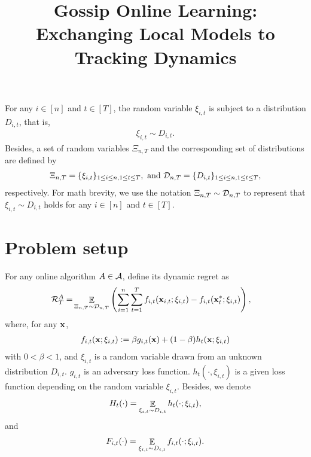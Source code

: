 \documentclass{article}
\title{Gossip Online Learning: Exchanging Local Models to Tracking Dynamics}
\begin{document}
\maketitle

\begin{abstract}








\end{abstract}



For any $i\in[n]$ and $t\in[T]$, the random variable $\xi_{i,t}$ is subject to a distribution $D_{i,t}$, that is,
\begin{align}
\nonumber
\xi_{i,t} \sim D_{i,t}.
\end{align} Besides, a set of random variables $\Xi_{n,T}$ and the corresponding set of distributions are defined by
\begin{align}
\nonumber
\Xi_{n,T} = \{ \xi_{i,t} \}_{1\le i \le n, 1 \le t \le T}, \text{~and~} \mathcal{D}_{n,T} = \{ D_{i,t} \}_{1\le i \le n, 1 \le t \le T},
\end{align} respectively. For math brevity, we use the notation $\Xi_{n,T} \sim \mathcal{D}_{n,T}$ to represent that $\xi_{i,t} \sim D_{i,t}$ holds for any $i\in[n]$ and $t\in[T]$.  


\section{Problem setup}


For any online algorithm $A \in {\mathcal{A}}$, define its dynamic regret as
\begin{align}
\nonumber
{\mathcal{R}}_T^{A} = & \mathop{\mathbb{E}}_{ \Xi_{n,T} \sim \mathcal{D}_{n,T} } \left(  \sum_{i=1}^n\sum_{t=1}^T f_{i,t}({\bf x}_{i,t};\xi_{i,t}) - f_{i,t}({\bf x}_t^\ast;\xi_{i,t})  \right),
\end{align} where, for any ${\bf x}$,
\begin{align}
\nonumber
f_{i,t}({\bf x};\xi_{i,t}) := \beta g_{i,t}({\bf x}) + (1-\beta) h_t({\bf x}; \xi_{i,t})
\end{align} with $0<\beta<1$, and $\xi_{i,t}$ is a random variable drawn from an unknown distribution $D_{i,t}$.  $g_{i,t}$ is an adversary loss function. $h_t(\cdot, \xi_{i,t})$ is a given loss function depending on the random variable $\xi_{i,t}$. Besides, we denote 
\begin{align}
\nonumber
H_t(\cdot) = \mathop{\mathbb{E}}_{\xi_{i,t} \sim D_{i,t}} h_t(\cdot; \xi_{i,t}),
\end{align} and 
\begin{align}
\nonumber
F_{i,t}(\cdot) = \mathop{\mathbb{E}}_{\xi_{i,t} \sim D_{i,t}} f_{i,t}(\cdot; \xi_{i,t}).
\end{align}
\end{document}
